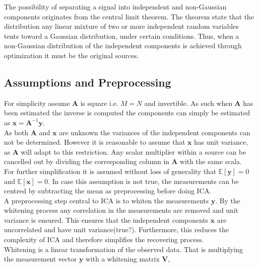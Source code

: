 The possibility of separating a signal into independent and non-Gaussian components originates from the central limit theorem\cite[p. 34]{ICA}. The theorem state that the distribution any linear mixture of two or more independent random variables tents toward a Gaussian distribution, under certain conditions. Thus, when a non-Gaussian distribution of the independent components is achieved through optimization it must be the original sources.

\subsection{Assumptions and Preprocessing}
For simplicity assume $\textbf{A}$ is square i.e. $M=N$ and invertible. As such when $\textbf{A}$ has been estimated the inverse is computed the components can simply be estimated as $\textbf{x}=\textbf{A}^{-1}\textbf{y}$\cite[p. 152-153]{ICA}.
\\ 
As both $\textbf{A}$ and $\textbf{x}$ are unknown the variances of the independent components can not be determined. However it is reasonable to assume that $\mathbf{x}$ has unit variance, as $\textbf{A}$ will adapt to this restriction. Any scalar multiplier within a source can be cancelled out by dividing the corresponding column in $\textbf{A}$ with the same scala\cite[p. 154]{ICA}.\\  
For further simplification it is assumed without loss of generality that $\mathbb{E}[\mathbf{y}] = 0$ and $\mathbb{E}[\mathbf{x}] = 0$\cite[p. 154]{ICA}. In case this assumption is not true, the measurements can be centred by subtracting the mean as preprocessing before doing ICA.\\
A preprocessing step central to ICA is to whiten the measurements $\mathbf{y}$. By the whitening process any correlation in the measurements are removed and unit variance is ensured. This ensures that the independent components $\mathbf{x}$ are uncorrelated and have unit variance(true?). Furthermore, this reduces the complexity of ICA and therefore simplifies the recovering process.
\\
Whitening is a linear transformation of the observed data. That is multiplying the measurement vector $\textbf{y}$ with a whitening matrix $\textbf{V}$,
